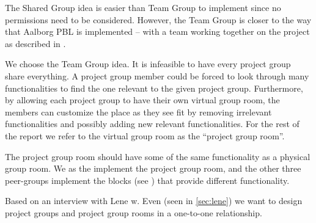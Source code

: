 The Shared Group idea is easier than Team Group to implement since no permissions need to be considered.
However, the Team Group is closer to the way that Aalborg PBL is implemented -- with a team working together on the project as described in .

We choose the Team Group idea. 
It is infeasible to have every project group share everything.
A project group member could be forced to look through many functionalities to find the one relevant to the given project group.
Furthermore, by allowing each project group to have their own virtual group room, the members can customize the place as they see fit by removing irrelevant functionalities and possibly adding new relevant functionalities.
For the rest of the report we refer to the virtual group room as the ``project group room''.

The project group room should have some of the same functionality as a physical group room.
We as the \groupname{} implement the project group room, and the other three peer-groups implement the blocks (see ) that provide different functionality.

Based on an interview with Lene w. Even (seen in \ref{sec:lene}) we want to design project groups and project group rooms in a one-to-one relationship.



